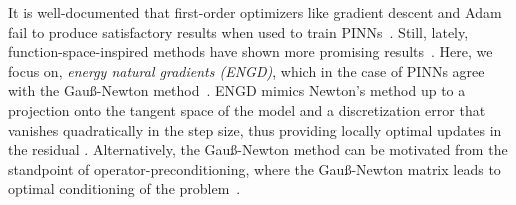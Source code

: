It is well-documented that first-order optimizers like gradient descent and Adam fail to produce satisfactory results when used to train PINNs~\citep{cuomo2022scientific}. Still, lately, function-space-inspired methods have shown more promising results~\citep{muller2024optimization}. 
Here, we focus on, \emph{energy natural gradients (ENGD)}, which in the case of PINNs agree with the Gauß-Newton method~\citep{muller2023achieving}. 
ENGD mimics Newton's method up to a projection onto the tangent space of the model and a discretization error that vanishes quadratically in the step size, thus providing locally optimal updates in the residual%
. Alternatively, the Gauß-Newton method can be motivated from the standpoint of operator-preconditioning, where the Gauß-Newton matrix leads to optimal conditioning of the problem~\citep{de2023operator}. 

